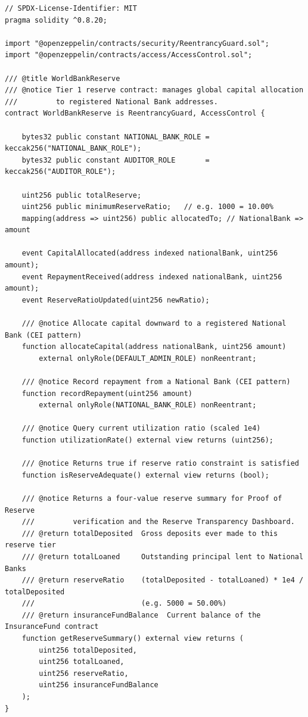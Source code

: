 \documentclass[12pt, a4paper]{report}
\begin{document}
\begin{lstlisting}[language=Solidity,basicstyle=\ttfamily\scriptsize,breaklines=true,
    commentstyle=\color{GrayText},keywordstyle=\color{PrimaryBlue}\bfseries,
    frame=single,rulecolor=\color{AccentBlue!40},captionpos=b,
    caption={WorldBankReserve.sol -- Tier 1 public interface. Full implementation in project repository.}]
// SPDX-License-Identifier: MIT
pragma solidity ^0.8.20;

import "@openzeppelin/contracts/security/ReentrancyGuard.sol";
import "@openzeppelin/contracts/access/AccessControl.sol";

/// @title WorldBankReserve
/// @notice Tier 1 reserve contract: manages global capital allocation
///         to registered National Bank addresses.
contract WorldBankReserve is ReentrancyGuard, AccessControl {

    bytes32 public constant NATIONAL_BANK_ROLE = keccak256("NATIONAL_BANK_ROLE");
    bytes32 public constant AUDITOR_ROLE       = keccak256("AUDITOR_ROLE");

    uint256 public totalReserve;
    uint256 public minimumReserveRatio;   // e.g. 1000 = 10.00%
    mapping(address => uint256) public allocatedTo; // NationalBank => amount

    event CapitalAllocated(address indexed nationalBank, uint256 amount);
    event RepaymentReceived(address indexed nationalBank, uint256 amount);
    event ReserveRatioUpdated(uint256 newRatio);

    /// @notice Allocate capital downward to a registered National Bank (CEI pattern)
    function allocateCapital(address nationalBank, uint256 amount)
        external onlyRole(DEFAULT_ADMIN_ROLE) nonReentrant;

    /// @notice Record repayment from a National Bank (CEI pattern)
    function recordRepayment(uint256 amount)
        external onlyRole(NATIONAL_BANK_ROLE) nonReentrant;

    /// @notice Query current utilization ratio (scaled 1e4)
    function utilizationRate() external view returns (uint256);

    /// @notice Returns true if reserve ratio constraint is satisfied
    function isReserveAdequate() external view returns (bool);

    /// @notice Returns a four-value reserve summary for Proof of Reserve
    ///         verification and the Reserve Transparency Dashboard.
    /// @return totalDeposited  Gross deposits ever made to this reserve tier
    /// @return totalLoaned     Outstanding principal lent to National Banks
    /// @return reserveRatio    (totalDeposited - totalLoaned) * 1e4 / totalDeposited
    ///                         (e.g. 5000 = 50.00%)
    /// @return insuranceFundBalance  Current balance of the InsuranceFund contract
    function getReserveSummary() external view returns (
        uint256 totalDeposited,
        uint256 totalLoaned,
        uint256 reserveRatio,
        uint256 insuranceFundBalance
    );
}
\end{lstlisting}
\end{document}
